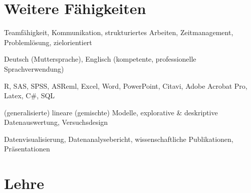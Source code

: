 \documentclass[11pt, a4paper]{awesome-cv}
\begin{document}
\hypertarget{weitere-fuxe4higkeiten}{%
\section{Weitere Fähigkeiten}\label{weitere-fuxe4higkeiten}}

\begin{cvskills}

  {Teamfähigkeit, Kommunikation, strukturiertes Arbeiten, Zeitmanagement, Problemlösung, zielorientiert} 
  
  {Deutsch (Muttersprache), Englisch (kompetente, professionelle Sprachverwendung)}
  
  {R, SAS, SPSS, ASReml, Excel, Word, PowerPoint, Citavi, Adobe Acrobat Pro, Latex, C\#, SQL} 
  
  {(generalisierte) lineare (gemischte) Modelle, explorative \& deskriptive Datenauswertung, Versuchsdesign} 
  
  {Datenvisualisierung, Datenanalysebericht, wissenschaftliche Publikationen, Präsentationen} 
  

\end{cvskills}

\hypertarget{lehre}{%
\section{Lehre}\label{lehre}}
\end{document}
